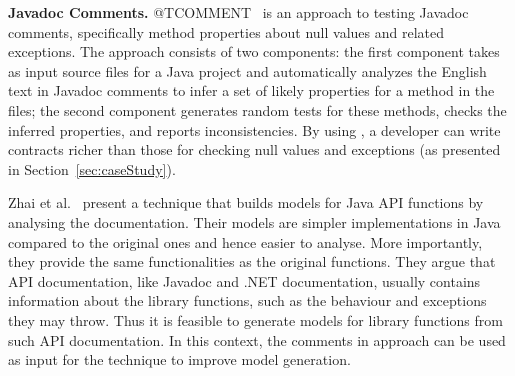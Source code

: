 \textbf{Javadoc Comments.}
@TCOMMENT~\cite{atComment} is an approach to testing Javadoc comments, specifically method properties about null values and related exceptions. The approach consists of two components: the first component takes as input source files for a Java project and automatically analyzes the English text in Javadoc comments to
infer a set of likely properties for a method in the files; the second component generates random tests for these methods, checks the inferred properties, and reports inconsistencies. By using
\contractjdoc{}, a developer can write contracts richer than those for checking null values and exceptions (as presented in Section~\ref{sec:caseStudy}).

Zhai et al.~\cite{docAnalysis} present a technique that builds models for Java API functions by analysing the documentation. Their models are simpler implementations in Java compared to the original ones and hence easier to analyse. More importantly, they provide the same functionalities as the original functions. They argue that API documentation, like Javadoc and .NET documentation, usually contains information about the library functions, such as the behaviour and exceptions they may throw. Thus it is feasible to generate models for library functions from such API documentation. In this context, the comments in \contractjdoc{} approach can be used as input for the technique to improve model generation.


